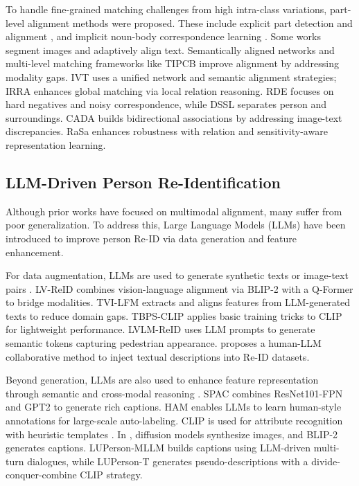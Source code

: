 To handle fine-grained matching challenges from high intra-class variations, part-level alignment methods were proposed. These include explicit part detection and alignment \cite{ding2021semantically, wang2020vitaa, li2023dcel,yuan2025modality,li2025text}, and implicit noun-body correspondence learning \cite{shao2023unified}. Some works \cite{wang2020high, chen2022tipcb} segment images and adaptively align text. Semantically aligned networks \cite{ding2021semantically} and multi-level matching frameworks like TIPCB \cite{chen2022tipcb} improve alignment by addressing modality gaps. IVT \cite{shu2022see} uses a unified network and semantic alignment strategies; IRRA \cite{IRRA} enhances global matching via local relation reasoning. RDE \cite{RDE} focuses on hard negatives and noisy correspondence, while DSSL \cite{zhu2021dssl} separates person and surroundings. CADA \cite{lin2024cross} builds bidirectional associations by addressing image-text discrepancies. RaSa \cite{bai2023rasa} enhances robustness with relation and sensitivity-aware representation learning.


\subsection{LLM-Driven Person Re-Identification}

Although prior works have focused on multimodal alignment, many suffer from poor generalization. To address this, Large Language Models (LLMs) have been introduced to improve person Re-ID via data generation and feature enhancement.

For data augmentation, LLMs are used to generate synthetic texts or image-text pairs \cite{yang2024mllmreid}. LV-ReID \cite{xia2025lv} combines vision-language alignment via BLIP-2 \cite{li2022blip} with a Q-Former to bridge modalities. TVI-LFM \cite{hu2024empowering} extracts and aligns features from LLM-generated texts to reduce domain gaps. TBPS-CLIP \cite{cao2024empirical} applies basic training tricks to CLIP for lightweight performance. LVLM-ReID \cite{wang2024large} uses LLM prompts to generate semantic tokens capturing pedestrian appearance. \cite{10879282} proposes a human-LLM collaborative method to inject textual descriptions into Re-ID datasets.

Beyond generation, LLMs are also used to enhance feature representation through semantic and cross-modal reasoning \cite{HAM, zuo2024plip, fu2022large}. SPAC \cite{zuo2024plip} combines ResNet101-FPN \cite{he2016deep, lin2017feature} and GPT2 \cite{radford2019language} to generate rich captions. HAM \cite{HAM} enables LLMs to learn human-style annotations for large-scale auto-labeling. CLIP \cite{radford2021learning} is used for attribute recognition with heuristic templates \cite{shao2023unified, HAM}. In \cite{yang2023towards}, diffusion models \cite{rombach2022high} synthesize images, and BLIP-2 \cite{li2022blip} generates captions. LUPerson-MLLM \cite{tan2024harnessing} builds captions using LLM-driven multi-turn dialogues, while LUPerson-T \cite{shao2023unified} generates pseudo-descriptions with a divide-conquer-combine CLIP strategy.







